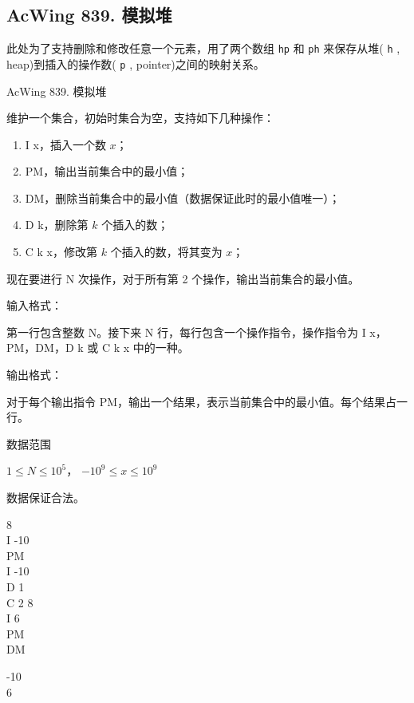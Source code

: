 \subsection{AcWing 839. 模拟堆}

此处为了支持删除和修改任意一个元素，用了两个数组 \lstinline{hp} 和 \lstinline{ph} 来保存从堆( \lstinline{h} , heap)到插入的操作数( \lstinline{p} , pointer)之间的映射关系。

\begin{titledbox}{AcWing 839. 模拟堆}

    维护一个集合，初始时集合为空，支持如下几种操作：

    \begin{enumerate}
        \itemsep=-5pt
        \item I x，插入一个数 $x$；
        \item PM，输出当前集合中的最小值；
        \item DM，删除当前集合中的最小值（数据保证此时的最小值唯一）；
        \item D k，删除第 $k$ 个插入的数；
        \item C k x，修改第 $k$ 个插入的数，将其变为 $x$；
    \end{enumerate}

    现在要进行 N 次操作，对于所有第 2 个操作，输出当前集合的最小值。

    输入格式：

    第一行包含整数 N。接下来 N 行，每行包含一个操作指令，操作指令为 I x，PM，DM，D k 或 C k x 中的一种。

    输出格式：

    对于每个输出指令 PM，输出一个结果，表示当前集合中的最小值。每个结果占一行。

    数据范围

    $1 \le N \le 10^5$， $−10^9 \le x \le 10^9$

    数据保证合法。

    \begin{inputblock}
        8 \\
        I -10 \\
        PM \\
        I -10 \\
        D 1 \\
        C 2 8 \\
        I 6 \\
        PM \\
        DM
    \end{inputblock}
    \begin{outputblock}
        -10 \\
        6
    \end{outputblock}
\end{titledbox}

